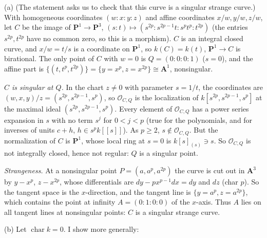 \documentclass[11pt]{article}
\begin{document}
\pf
(a) (The statement asks us to check that this curve is a singular strange curve.) With homogeneous coordinates $(w:x:y:z)$ and affine coordinates $x/w,y/w,z/w$, let $C$ be the image of $\mathbf P^1\to\mathbf P^3$, $(s:t)\mapsto(s^{2p}:s^{2p-1}t:s^pt^p:t^{2p})$ (the entries $s^{2p},t^{2p}$ have no common zero, so this is a morphism). $C$ is an integral closed curve, and $x/w=t/s$ is a coordinate on $\mathbf P^1$, so $k(C)=k(t)$, $\mathbf P^1\to C$ is birational. The only point of $C$ with $w=0$ is $Q=(0:0:0:1)$ ($s=0$), and the affine part is $\{(t,t^p,t^{2p})\}=\{y=x^p,z=x^{2p}\}\cong\mathbf A^1$, nonsingular.

\emph{$C$ is singular at $Q$.} In the chart $z\ne0$ with parameter $s=1/t$, the coordinates are $(w,x,y)/z=(s^{2p},s^{2p-1},s^p)$, so $\mathcal O_{C,Q}$ is the localization of $k[s^{2p},s^{2p-1},s^p]$ at the maximal ideal $(s^{2p},s^{2p-1},s^p)$. Every element of $\mathcal O_{C,Q}$ has a power series expansion in $s$ with no term $s^j$ for $0<j<p$ (true for the polynomials, and for inverses of units $c+h$, $h\in s^pk[[s]]$). As $p\ge2$, $s\notin\mathcal O_{C,Q}$. But the normalization of $C$ is $\mathbf P^1$, whose local ring at $s=0$ is $k[s]_{(s)}\ni s$. So $\mathcal O_{C,Q}$ is not integrally closed, hence not regular: $Q$ is a singular point.

\emph{Strangeness.} At a nonsingular point $P=(a,a^p,a^{2p})$ the curve is cut out in $\mathbf A^3$ by $y-x^p$, $z-x^{2p}$, whose differentials are $dy-px^{p-1}dx=dy$ and $dz$ (char $p$). So the tangent space is the $x$-direction, and the tangent line is $\{y=a^p,z=a^{2p}\}$, which contains the point at infinity $A=(0:1:0:0)$ of the $x$-axis. Thus $A$ lies on all tangent lines at nonsingular points: $C$ is a singular strange curve.

(b) Let $\operatorname{char}k=0$. I show more generally:
\end{document}
